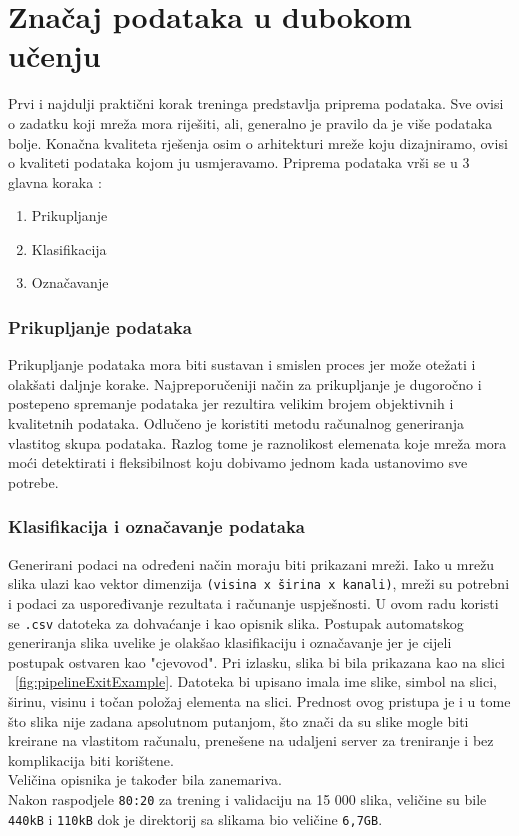 \section{Značaj podataka u dubokom učenju}
Prvi i najdulji praktični korak treninga predstavlja priprema podataka. 
Sve ovisi o zadatku koji mreža mora riješiti, ali, generalno je pravilo da je više podataka bolje.
Konačna kvaliteta rješenja osim o arhitekturi mreže koju dizajniramo, ovisi o kvaliteti podataka kojom ju usmjeravamo.
Priprema podataka vrši se u 3 glavna koraka \cite{generalDatasets}:
\begin{enumerate}
\item Prikupljanje
\item Klasifikacija
\item Označavanje
\end{enumerate} 
\subsubsection{Prikupljanje podataka}
Prikupljanje podataka mora biti sustavan i smislen proces jer može otežati i olakšati daljnje korake. 
Najpreporučeniji način za prikupljanje je dugoročno i postepeno spremanje podataka jer rezultira velikim brojem objektivnih i kvalitetnih podataka.
Odlučeno je koristiti metodu računalnog generiranja vlastitog skupa podataka. 
Razlog tome je raznolikost elemenata koje mreža mora moći detektirati i fleksibilnost koju dobivamo jednom kada ustanovimo sve potrebe.
\subsubsection{Klasifikacija i označavanje podataka}
Generirani podaci na određeni način moraju biti prikazani mreži. 
Iako u mrežu slika ulazi kao vektor dimenzija \texttt{(visina x širina x kanali)}, mreži su potrebni i podaci za uspoređivanje rezultata i računanje uspješnosti.
U ovom radu koristi se \texttt{.csv} datoteka za dohvaćanje i kao opisnik slika. 
Postupak automatskog generiranja slika uvelike je olakšao klasifikaciju i označavanje jer je cijeli postupak ostvaren kao "cjevovod".
Pri izlasku, slika bi bila prikazana kao na slici ~\ref{fig:pipelineExitExample}.
Datoteka bi upisano imala ime slike, simbol na slici, širinu, visinu i točan položaj elementa na slici. 
Prednost ovog pristupa je i u tome što slika nije zadana apsolutnom putanjom, što znači da su slike mogle biti kreirane na vlastitom računalu, prenešene na udaljeni server za treniranje i bez komplikacija biti korištene. \\
Veličina opisnika je također bila zanemariva. \\ 
Nakon raspodjele \texttt{80:20} za trening i validaciju na 15 000 slika, veličine su bile \texttt{440kB} i \texttt{110kB} dok je direktorij sa slikama bio veličine \texttt{6,7GB}.

